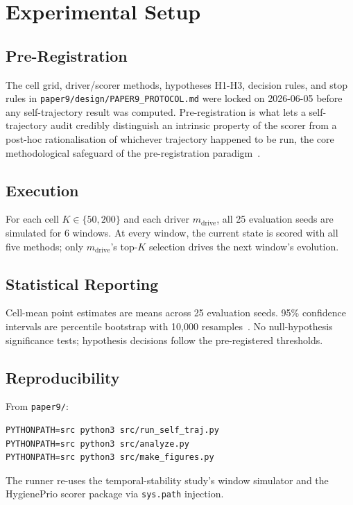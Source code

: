 \section{Experimental Setup}

\subsection{Pre-Registration}

The cell grid, driver/scorer methods, hypotheses H1-H3, decision rules,
and stop rules in \texttt{paper9/design/PAPER9\_PROTOCOL.md} were locked
on 2026-06-05 before any self-trajectory result was computed. Pre-registration
is what lets a self-trajectory audit credibly distinguish an intrinsic
property of the scorer from a post-hoc rationalisation of whichever
trajectory happened to be run, the core methodological safeguard of the
pre-registration paradigm~\cite{nosek2018preregistration}.

\subsection{Execution}

For each cell $K \in \{50, 200\}$ and each driver $m_{\text{drive}}$,
all 25 evaluation seeds are simulated for 6 windows. At every window,
the current state is scored with all five methods; only $m_{\text{drive}}$'s
top-$K$ selection drives the next window's evolution.

\subsection{Statistical Reporting}

Cell-mean point estimates are means across 25 evaluation seeds. 95\%
confidence intervals are percentile bootstrap with 10{,}000
resamples~\cite{efron1994introduction,diciccio1996bootstrap}. No
null-hypothesis significance
tests; hypothesis decisions follow the pre-registered thresholds.

\subsection{Reproducibility}

From \texttt{paper9/}:
{\small\begin{verbatim}
PYTHONPATH=src python3 src/run_self_traj.py
PYTHONPATH=src python3 src/analyze.py
PYTHONPATH=src python3 src/make_figures.py
\end{verbatim}}
The runner re-uses the temporal-stability study's window simulator and the HygienePrio scorer
package via \texttt{sys.path} injection.

